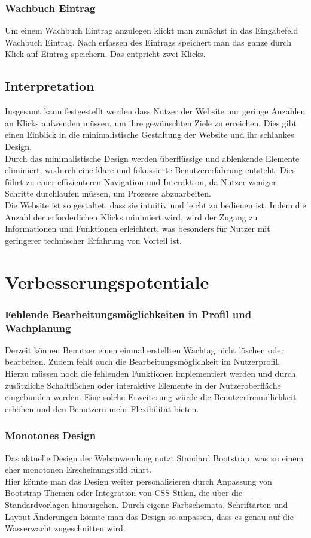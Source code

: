 \documentclass[fontsize=12pt,openright,oneside,paper=a4,BCOR=1cm]{scrbook}
\begin{document}
\subsubsection{Wachbuch Eintrag}
Um einem Wachbuch Eintrag anzulegen klickt man zunächst in das Eingabefeld \glqq Wachbuch Eintrag\grqq{}. Nach erfassen des Eintrags speichert man das ganze durch Klick auf \glqq Eintrag speichern\grqq{}. Das entpricht zwei Klicks.

\subsection{Interpretation}
Insgesamt kann festgestellt werden dass Nutzer der Website nur geringe Anzahlen an Klicks aufwenden müssen, um ihre gewünschten Ziele zu erreichen. Dies gibt einen Einblick in die minimalistische Gestaltung der Website und ihr schlankes Design. \\ 
Durch das minimalistische Design werden überflüssige und ablenkende Elemente eliminiert, wodurch eine klare und fokussierte Benutzererfahrung entsteht. Dies führt zu einer effizienteren Navigation und Interaktion, da Nutzer weniger Schritte durchlaufen müssen, um Prozesse abzuarbeiten. \\
Die Website ist so gestaltet, dass sie intuitiv und leicht zu bedienen ist. Indem die Anzahl der erforderlichen Klicks minimiert wird, wird der Zugang zu Informationen und Funktionen erleichtert, was besonders für Nutzer mit geringerer technischer Erfahrung von Vorteil ist. 

\section{Verbesserungspotentiale}

\subsubsection{Fehlende Bearbeitungsmöglichkeiten in Profil und Wachplanung}
Derzeit können Benutzer einen einmal erstellten Wachtag nicht löschen oder bearbeiten. Zudem fehlt auch die Bearbeitungsmöglichkeit im Nutzerprofil. \\ 
Hierzu müssen noch die fehlenden Funktionen implementiert werden und durch zusätzliche Schaltflächen oder interaktive Elemente in der Nutzeroberfläche eingebunden werden. Eine solche Erweiterung würde die Benutzerfreundlichkeit erhöhen und den Benutzern mehr Flexibilität bieten.

\subsubsection{Monotones Design} 
Das aktuelle Design der Webanwendung nutzt Standard Bootstrap, was zu einem eher monotonen Erscheinungsbild führt. \\ 
Hier könnte man das Design weiter personalisieren durch Anpassung von Bootstrap-Themen oder Integration von CSS-Stilen, die über die Standardvorlagen hinausgehen. Durch eigene Farbschemata, Schriftarten und Layout Änderungen könnte man das Design so anpassen, dass es genau auf die Wasserwacht zugeschnitten wird.
\end{document}
